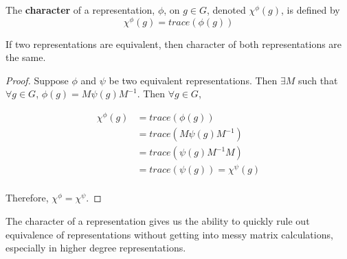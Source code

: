 \begin{definition}
	The \textbf{character} of a representation, $\phi$, on $g \in G$, denoted $\chi^{\phi}(g)$, is defined by $$\chi^{\phi}(g)=trace(\phi(g))$$
\end{definition}

\begin{theorem}
	If two representations are equivalent, then character of both representations are the same.
\end{theorem}

\begin{proof}Suppose $\phi$ and $\psi$ be two equivalent representations. Then $\exists M$ such that $\forall g \in G$, $\phi(g) = M\psi(g)M^{-1}$. Then $\forall g \in G$,

\begin{equation}
	\begin{aligned}
		\chi^{\phi}(g) &= trace(\phi(g)) \\
						&= trace(M\psi(g)M^{-1}) \\
						&= trace(\psi(g)M^{-1}M) \\
						&= trace(\psi(g)) = \chi^{\psi}(g) \\
	\end{aligned}
\end{equation}

Therefore, $\chi^{\phi} = \chi^{\psi}$. \end{proof}

The character of a representation gives us the ability to quickly rule out equivalence of representations without getting into messy matrix calculations, especially in higher degree representations.

